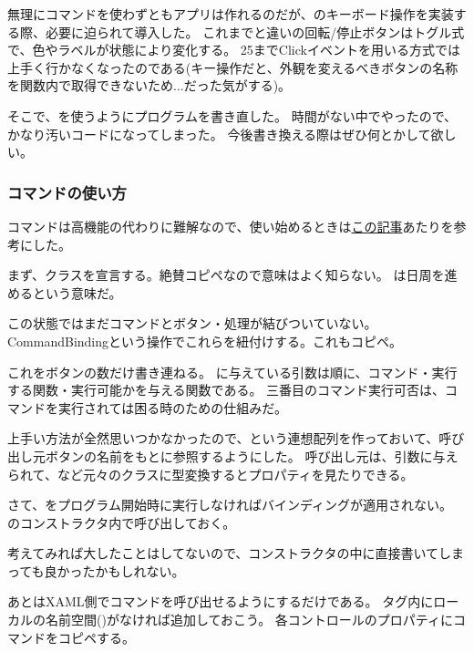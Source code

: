 \documentclass[letterpaper,10pt,dvipdfmx]{sphinxmanual}
\begin{document}
無理にコマンドを使わずともアプリは作れるのだが、のキーボード操作を実装する際、必要に迫られて導入した。
これまでと違いの回転/停止ボタンはトグル式で、色やラベルが状態により変化する。
25までClickイベントを用いる方式では上手く行かなくなったのである(キー操作だと、外観を変えるべきボタンの名称を関数内で取得できないため...だった気がする)。

そこで、を使うようにプログラムを書き直した。
時間がない中でやったので、かなり汚いコードになってしまった。
今後書き換える際はぜひ何とかして欲しい。


\subsubsection{コマンドの使い方}
\label{\detokenize{nissyu-idohen/pc-software-code:id10}}
コマンドは高機能の代わりに難解なので、使い始めるときは\href{http://techoh.net/wpf-make-command-in-5steps/}{この記事}あたりを参考にした。

まず、クラスを宣言する。絶賛コピペなので意味はよく知らない。
は日周を進めるという意味だ。

この状態ではまだコマンドとボタン・処理が結びついていない。
CommandBindingという操作でこれらを紐付けする。これもコピペ。

これをボタンの数だけ書き連ねる。
に与えている引数は順に、コマンド・実行する関数・実行可能かを与える関数である。
三番目のコマンド実行可否は、コマンドを実行されては困る時のための仕組みだ。

上手い方法が全然思いつかなかったので、という連想配列を作っておいて、呼び出し元ボタンの名前をもとに参照するようにした。
呼び出し元は、引数に与えられて、など元々のクラスに型変換するとプロパティを見たりできる。

さて、をプログラム開始時に実行しなければバインディングが適用されない。
のコンストラクタ内で呼び出しておく。

考えてみれば大したことはしてないので、コンストラクタの中に直接書いてしまっても良かったかもしれない。

あとはXAML側でコマンドを呼び出せるようにするだけである。
タグ内にローカルの名前空間()がなければ追加しておこう。
各コントロールのプロパティにコマンドをコピペする。
\end{document}
